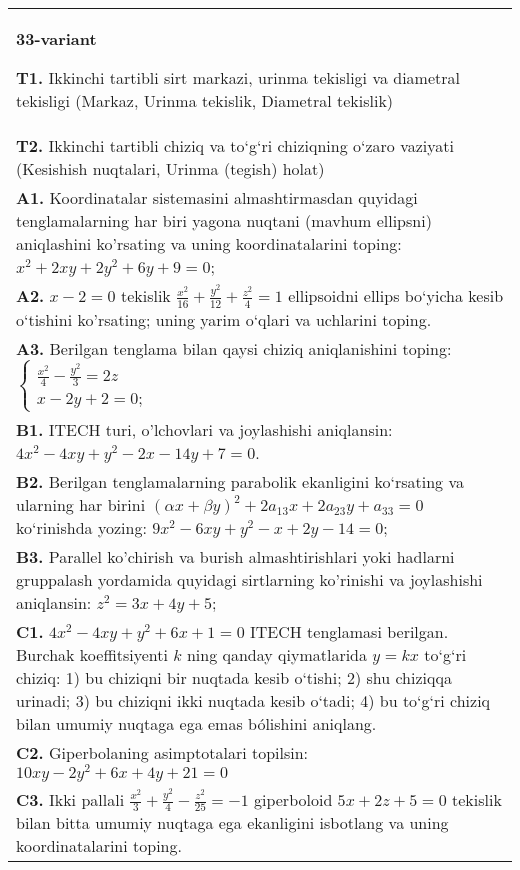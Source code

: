 \documentclass{article}
\begin{document}
\begin{tabular}{m{17cm}}
\textbf{33-variant}
\newline

\textbf{T1.} Ikkinchi tartibli sirt markazi, urinma tekisligi va diametral tekisligi (Markaz, Urinma tekislik, Diametral tekislik) \\
\textbf{T2.} Ikkinchi tartibli chiziq va to‘g‘ri chiziqning o‘zaro vaziyati (Kesishish nuqtalari, Urinma (tegish) holat) \\
\textbf{A1.} Koordinatalar sistemasini almashtirmasdan quyidagi tenglamalarning har biri yagona nuqtani (mavhum ellipsni) aniqlashini ko'rsating va uning koordinatalarini toping: $x^2+2 x y+2 y^2+6 y+9=0$; \\
\textbf{A2.} $x-2=0$ tekislik $\frac{x^2}{16}+\frac{y^2}{12}+\frac{z^2}{4}=1$ ellipsoidni ellips bo‘yicha kesib o‘tishini ko'rsating; uning yarim o‘qlari va uchlarini toping. \\
\textbf{A3.} Berilgan tenglama bilan qaysi chiziq aniqlanishini toping: $\left\{\begin{array}{l}\frac{x^2}{4}-\frac{y^2}{3}=2 z \\ x-2 y+2=0 ;\end{array}\right.$ \\
\textbf{B1.} ITECH turi, o'lchovlari va joylashishi aniqlansin: $4 x^2-4 x y+y^2-2 x-14 y+7=0$. \\
\textbf{B2.} Berilgan tenglamalarning parabolik ekanligini ko‘rsating va ularning har birini $(\alpha x+\beta y)^2+2 a_{13} x+2 a_{23} y+a_{33}=0$ ko‘rinishda yozing: $9 x^2-6 x y+y^2-x+2 y-14=0$; \\
\textbf{B3.} Parallel ko'chirish va burish almashtirishlari yoki hadlarni gruppalash yordamida quyidagi sirtlarning ko'rinishi va joylashishi aniqlansin: $z^2=3 x+4 y+5$; \\
\textbf{C1.} $4 x^2-4 x y+y^2+6 x+1=0$ ITECH tenglamasi berilgan. Burchak koeffitsiyenti $k$ ning qanday qiymatlarida $y=kx$ to‘g‘ri chiziq: 1) bu chiziqni bir nuqtada kesib o‘tishi; 2) shu chiziqqa urinadi; 3) bu chiziqni ikki nuqtada kesib o‘tadi; 4) bu to‘g‘ri chiziq bilan umumiy nuqtaga ega emas bólishini aniqlang. \\
\textbf{C2.} Giperbolaning asimptotalari topilsin: $10 x y-2 y^2+6 x+4 y+21=0$ \\
\textbf{C3.} Ikki pallali $\frac{x^2}{3}+\frac{y^2}{4}-\frac{z^2}{25}=-1$ giperboloid $5 x+2 z+5=0$ tekislik bilan bitta umumiy nuqtaga ega ekanligini isbotlang va uning koordinatalarini toping. \\

\end{tabular}
\vspace{1cm}
\end{document}
